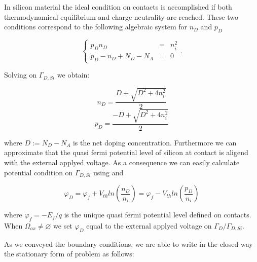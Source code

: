 In silicon material the ideal condition on contacts is accomplished if both thermodynamical equilibrium and charge neutrality are reached. These two conditions correspond to the following algebraic system for $n_D$ and $p_D$

\begin{equation}
\label{eq: systemo for dirichlet condition}
\left\{
\begin{array}{lcl}
p_Dn_D & = &n_i^2 \\
p_D -n_D +N_D-N_A & = & 0 
\end{array}
\right. .
\end{equation}

Solving  on $\Gamma_{D,Si}$ we obtain:

\begin{equation}
n_D = \dfrac{D + \sqrt{D^2+4n_i^2}}{2}
\end{equation}
\begin{equation}
p_D = \dfrac{-D + \sqrt{D^2+4n_i^2}}{2}
\end{equation}

where $D := N_D-N_A$ is the net doping concentration. Furthermore  we can approximate that the quasi fermi potential level of silicon at contact is aligend with the external applyed voltage. As a consequence we can easily calculate potential condition on $\Gamma_{D,Si}$ using  and 

\begin{equation}
\varphi_D = \varphi_f + V_{th}ln\left( \dfrac{n_D}{n_i} \right) = \varphi_f - V_{th}ln\left( \dfrac{p_D}{n_i} \right)
\end{equation}

where $\varphi_f = - E_f / q$ is the unique quasi fermi potential level defined on contacts. When $\Omega_{ox} \neq \varnothing$ we set $\varphi_D$ equal to the external applyed voltage on $\Gamma_D / \Gamma_{D,Si}$.


As we conveyed the boundary conditions, we are able to write in the closed way the stationary form of problem  as follows:
 

